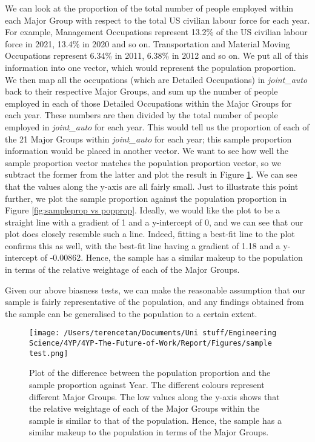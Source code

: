 \documentclass[11pt]{article}
\begin{document}
We can look at the proportion of the total number of people employed within each Major Group with respect to the total US civilian labour force for each year. For example, Management Occupations represent 13.2\% of the US civilian labour force in 2021, 13.4\% in 2020 and so on. Transportation and Material Moving Occupations represent 6.34\% in 2011, 6.38\% in 2012 and so on. We put all of this information into one vector, which would represent the population proportion. We then map all the occupations (which are Detailed Occupations) in \emph{joint\_auto} back to their respective Major Groups, and sum up the number of people employed in each of those Detailed Occupations within the Major Groups for each year. These numbers are then divided by the total number of people employed in \emph{joint\_auto} for each year. This would tell us the proportion of each of the 21 Major Groups within \emph{joint\_auto} for each year; this sample proportion information would be placed in another vector. We want to see how well the sample proportion vector matches the population proportion vector, so we subtract the former from the latter and plot the result in Figure \ref{fig:relativeweightage}. We can see that the values along the y-axis are all fairly small. Just to illustrate this point further, we plot the sample proportion against the population proportion in Figure \ref{fig:sampleprop vs popprop}. Ideally, we would like the plot to be a straight line with a gradient of 1 and a y-intercept of 0, and we can see that our plot does closely resemble such a line. Indeed, fitting a best-fit line to the plot confirms this as well, with the best-fit line having a gradient of 1.18 and a y-intercept of -0.00862. Hence, the sample has a similar makeup to the population in terms of the relative weightage of each of the Major Groups.

Given our above biasness tests, we can make the reasonable assumption that our sample is fairly representative of the population, and any findings obtained from the sample can be generalised to the population to a certain extent.


\begin{figure}[!htb]
	\centering
	\texttt{[image: /Users/terencetan/Documents/Uni stuff/Engineering Science/4YP/4YP-The-Future-of-Work/Report/Figures/sample test.png]}
	\caption{Plot of the difference between the population proportion and the sample proportion against Year. The different colours represent different Major Groups. The low values along the y-axis shows that the relative weightage of each of the Major Groups within the sample is similar to that of the population. Hence, the sample has a similar makeup to the population in terms of the Major Groups.}
	\label{fig:relativeweightage}
\end{figure}
\end{document}
